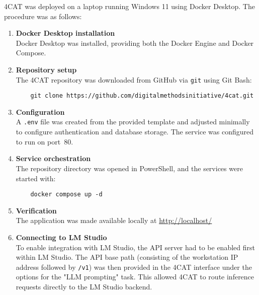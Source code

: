 4CAT was deployed on a laptop running Windows 11 using Docker Desktop. The procedure was as follows:

\begin{enumerate}
    \item \textbf{Docker Desktop installation} \\
    Docker Desktop was installed, providing both the Docker Engine and Docker Compose.

    \item \textbf{Repository setup} \\
    The 4CAT repository was downloaded from GitHub via \texttt{git} using Git Bash:
    \begin{verbatim}
    git clone https://github.com/digitalmethodsinitiative/4cat.git
    \end{verbatim} 

    \item \textbf{Configuration} \\
    A \texttt{.env} file was created from the provided template and adjusted minimally to configure authentication and database storage. 
    The service was configured to run on port~80.

    \item \textbf{Service orchestration} \\
    The repository directory was opened in PowerShell, and the services were started with:
    \begin{verbatim}
    docker compose up -d
    \end{verbatim} 

    \item \textbf{Verification} \\
    The application was made available locally at \url{http://localhost/} 

    \item \textbf{Connecting to LM Studio} \\
    To enable integration with LM Studio, the API server had to be enabled first within LM Studio. 
    The API base path (consisting of the workstation IP address followed by \texttt{/v1}) was then provided in the 4CAT interface under the options for the "LLM prompting" task. 
    This allowed 4CAT to route inference requests directly to the LM Studio backend.
\end{enumerate}
